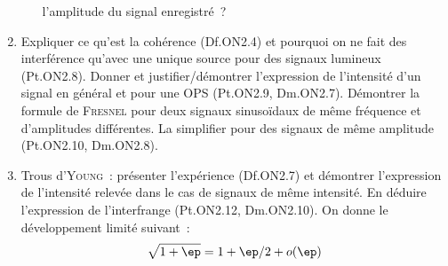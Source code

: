 \documentclass[a4paper, 12pt, final, garamond]{book}
\begin{document}
\begin{enumerate}
\begin{enumerate}[label=\sqenumi]
		            l'amplitude du signal enregistré~?
	      \end{enumerate}
	\item Expliquer ce qu'est la cohérence (Df.ON2.4) et pourquoi on ne fait des
	      interférence qu'avec une unique source pour des signaux lumineux (Pt.ON2.8).
	      Donner et justifier/démontrer l'expression de l'intensité d'un signal en
	      général et pour une OPS (Pt.ON2.9, Dm.ON2.7). Démontrer la formule de
	      \textsc{Fresnel} pour deux signaux sinusoïdaux de même fréquence et
	      d'amplitudes différentes. La simplifier pour des signaux de même
	      amplitude (Pt.ON2.10, Dm.ON2.8).
	\item Trous d'\textsc{Young}~: présenter l'expérience (Df.ON2.7) et démontrer
	      l'expression de l'intensité relevée dans le cas de signaux de même
	      intensité. En déduire l'expression de l'interfrange (Pt.ON2.12,
	      Dm.ON2.10).
	      \smallbreak
	      On donne le développement limité suivant~:
	      \[\sqrt{1+\ep} = 1 + \ep/2 + o(\ep)\]
\end{enumerate}
\end{document}
